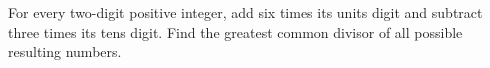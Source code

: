 For every two-digit positive integer, add six times its units digit and subtract three times its tens digit. Find the greatest common divisor of all possible resulting numbers.
